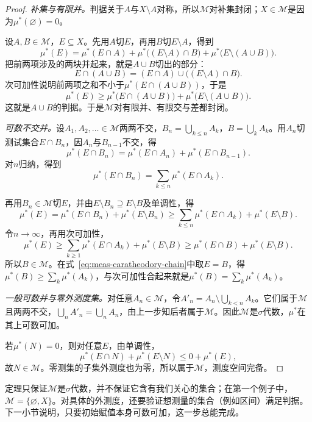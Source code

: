 \begin{proof}
\emph{补集与有限并。}判据关于$A$与$X\setminus A$对称，所以$\mathcal M$对补集封闭；$X\in\mathcal M$是因为$\mu^*(\varnothing)=0$。

设$A,B\in\mathcal M$，$E\subseteq X$。先用$A$切$E$，再用$B$切$E\setminus A$，得到
\[
 \mu^*(E)=\mu^*(E\cap A)+\mu^*\bigl((E\setminus A)\cap B\bigr)+\mu^*\bigl(E\setminus(A\cup B)\bigr).
\]
把前两项涉及的两块并起来，就是$A\cup B$切出的部分：
\[
 E\cap(A\cup B)=(E\cap A)\cup\bigl((E\setminus A)\cap B\bigr).
\]
次可加性说明前两项之和不小于$\mu^*(E\cap(A\cup B))$，于是
\[
 \mu^*(E)\geq\mu^*\bigl(E\cap(A\cup B)\bigr)+\mu^*\bigl(E\setminus(A\cup B)\bigr).
\]
这就是$A\cup B$的判据。于是$\mathcal M$对有限并、有限交与差都封闭。

\emph{可数不交并。}设$A_1,A_2,\dots\in\mathcal M$两两不交，$B_n=\bigcup_{k\leq n}A_k$，$B=\bigcup_kA_k$。用$A_n$切测试集合$E\cap B_n$，因$A_n$与$B_{n-1}$不交，得
\[
 \mu^*(E\cap B_n)=\mu^*(E\cap A_n)+\mu^*(E\cap B_{n-1}).
\]
对$n$归纳，得到
\[
 \mu^*(E\cap B_n)=\sum_{k\leq n}\mu^*(E\cap A_k).
\]

再用$B_n\in\mathcal M$切$E$，并由$E\setminus B_n\supseteq E\setminus B$及单调性，得
\[
 \mu^*(E)=\mu^*(E\cap B_n)+\mu^*(E\setminus B_n)
 \geq\sum_{k\leq n}\mu^*(E\cap A_k)+\mu^*(E\setminus B).
\]
令$n\to\infty$，再用次可加性，
\begin{equation}
 \mu^*(E)\geq\sum_{k\geq1}\mu^*(E\cap A_k)+\mu^*(E\setminus B)
 \geq\mu^*(E\cap B)+\mu^*(E\setminus B).
 \label{eq:meas-caratheodory-chain}
\end{equation}
所以$B\in\mathcal M$。在式~\eqref{eq:meas-caratheodory-chain}中取$E=B$，得$\mu^*(B)\geq\sum_k\mu^*(A_k)$，与次可加性合起来就是$\mu^*(B)=\sum_k\mu^*(A_k)$。

\emph{一般可数并与零外测度集。}对任意$A_n\in\mathcal M$，令$A'_n=A_n\setminus\bigcup_{k<n}A_k$。它们属于$\mathcal M$且两两不交，$\bigcup_nA'_n=\bigcup_nA_n$，由上一步知后者属于$\mathcal M$。因此$\mathcal M$是$\sigma$代数，$\mu^*$在其上可数可加。

若$\mu^*(N)=0$，则对任意$E$，由单调性，
\[
 \mu^*(E\cap N)+\mu^*(E\setminus N)\leq0+\mu^*(E),
\]
故$N\in\mathcal M$。零测集的子集外测度也为零，所以属于$\mathcal M$，测度空间完备。
\end{proof}

定理只保证$\mathcal M$是$\sigma$代数，并不保证它含有我们关心的集合；在第一个例子中，$\mathcal M=\{\varnothing,X\}$。对具体的外测度，还要验证想测量的集合（例如区间）满足判据。下一小节说明，只要初始赋值本身可数可加，这一步总能完成。

